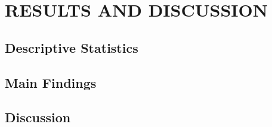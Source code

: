 
\chapter{RESULTS AND DISCUSSION}\label{chap:results}


\section{Descriptive Statistics}\label{sec:descriptive}

\section{Main Findings}\label{sec:findings}

\section{Discussion}\label{sec:discussion}


